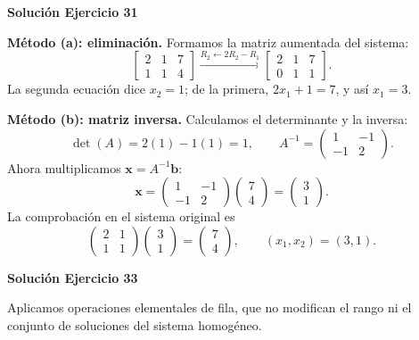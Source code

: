 \documentclass[12pt]{article}
\newcommand{\vect}[1]{\boldsymbol{#1}}
\begin{document}
\par\bigskip\noindent\textbf{Solución Ejercicio 31}\par\nobreak
\textbf{Método (a): eliminación.} Formamos la matriz aumentada del sistema:
\[
\left[\begin{array}{rr|r}2&1&7\\1&1&4\end{array}\right]\xrightarrow{R_2\leftarrow2R_2-R_1}\left[\begin{array}{rr|r}2&1&7\\0&1&1\end{array}\right].
\]
La segunda ecuación dice $x_2=1$; de la primera, $2x_1+1=7$, y así $x_1=3$.

\textbf{Método (b): matriz inversa.} Calculamos el determinante y la inversa:
\[
\det(A)=2(1)-1(1)=1,\qquad A^{-1}=\begin{pmatrix}1&-1\\-1&2\end{pmatrix}.
\]
Ahora multiplicamos $\vect x=A^{-1}\vect b$:
\[
\vect x=\begin{pmatrix}1&-1\\-1&2\end{pmatrix}\begin{pmatrix}7\\4\end{pmatrix}=\begin{pmatrix}3\\1\end{pmatrix}.
\]
La comprobación en el sistema original es
\[
\begin{pmatrix}2&1\\1&1\end{pmatrix}\begin{pmatrix}3\\1\end{pmatrix}=\begin{pmatrix}7\\4\end{pmatrix},\qquad\boxed{(x_1,x_2)=(3,1)}.
\]

\par\bigskip\noindent\textbf{Solución Ejercicio 33}\par\nobreak
Aplicamos operaciones elementales de fila, que no modifican el rango ni el conjunto de soluciones del sistema homogéneo.
\end{document}
